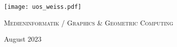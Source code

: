 \makeatletter
\begin{titlepage}
  \begin{center}
    \texttt{[image: uos\_weiss.pdf]}


    {\large \textsc{Medieninformatik / Graphics \& Geometric Computing}} 

    \vspace{1cm}


    {\Large \textbf{\SeminarTitle{}}}

    \vspace{5mm}

    {\large \SeminarTerm{}}

    \vspace{2.5cm}

    {\sffamily\bfseries\selectfont\Huge
      \@PaperTitle
      \par
    }

    \vspace{3.5cm}

    {\Large \@Authors}

    \vspace{5mm}

    {\Large {August 2023}}
  \end{center}
\end{titlepage}
\makeatother
